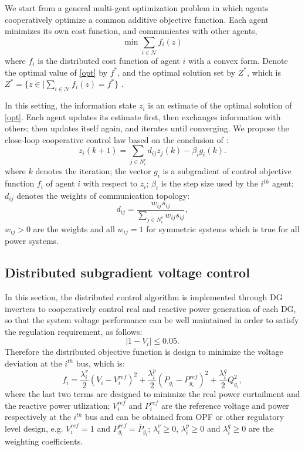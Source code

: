 \documentclass{article}
\begin{document}
We start from a general multi-gent optimization problem in which agents cooperatively optimize a common additive objective function. Each agent minimizes its own cost function, and communicates with other agents,
\begin{equation}
\min \sum_{i\in \mathcal{N}} f_i(z)
\label{opt}
\end{equation}
where $f_i$ is the distributed cost function of agent $i$ with a convex form. Denote the optimal value of \eqref{opt} by $f^*$, and the optimal solution set by $Z^*$, which is $Z^* = \{ z \in | \sum_{i\in \mathcal{N}} f_i(z) = f^*\}$ .\par
In this setting, the information state $z_i$ is an estimate of the optimal solution of \eqref{opt}. Each agent updates its estimate first, then exchanges information with others; then updates itself again, and iterates until converging. We propose the close-loop cooperative control law based on the conclusion of \cite{nedic2009distributed}:
\begin{equation}
z_i(k+1) = \sum_{j \in N_i^c}d_{ij} z_j(k) - \beta_i g_{i}(k).
\label{eq:ccl}
\end{equation} 
where $k$ denotes the iteration; the vector $g_{i}$ is a subgradient of control objective function $f_i$ of agent $i$ with respect to $z_i$; $\beta_i$ is the step size used by the $i^{th}$ agent; $d_{ij}$ denotes the weights of communication topology:
\begin{equation}
 d_{ij} =\frac{w_{ij} s_{ij}}{\sum_{j\in N_i^c}w_{ij} s_{ij}},    \label{eq:dij}
\end{equation}
$w_{ij}>0$ are the weights and all $w_{ij}=1$ for symmetric systems which is true for all power systems. 

\subsection{Distributed subgradient voltage control}
In this section, the distributed control algorithm is implemented through DG inverters to cooperatively control real and reactive power generation of each DG, so that the system voltage performance can be well maintained in order to satisfy the regulation requirement, as follows:
\begin{equation}
    |1-V_i |\leq 0.05.
\end{equation}
Therefore the distributed objective function is design to minimize the voltage deviation at the $i^{th}$ bus, which is:
\begin{equation}
    f_i =\frac{\lambda^v_i}{2}(V_i-V_i^{ref})^2+\frac{\lambda^p_i}{2}(P_{g_i}-P^{ref}_{g_i})^2+\frac{\lambda^q_i}{2}Q_{g_i}^2,\label{eq:fiv}
\end{equation}
where the last two terms are designed to minimize the real power curtailment and the reactive power utlization; $V_i^{ref}$ and $P_i^{ref}$ are the reference voltage and power respectively at the $i^{th}$ bus and can be obtained from OPF or other regulatory level design, e.g. $V_i^{ref}=1$ and $P_{g_i}^{ref}=\overline{P}_{g_i}$; $\lambda^v_i\geq 0$, $\lambda^p_i\geq 0$ and $\lambda^q_i\geq 0$ are the weighting coefficients. 
\end{document}
